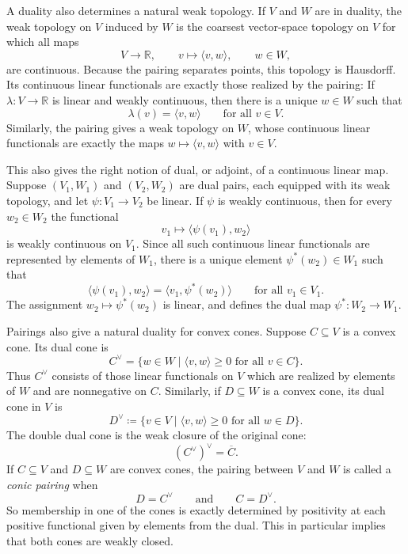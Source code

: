 \documentclass[11pt,onecolumn]{article}
\theoremstyle{plain}
\theoremstyle{definition}
\begin{document}
A duality also determines a natural weak topology.  If $V$ and $W$ are in
duality, the weak topology on $V$ induced by $W$ is
the coarsest vector-space topology on $V$ for which all maps
\[
    V\to\mathbb{R},\qquad v\mapsto \langle v,w\rangle,
    \qquad w\in W,
\]
are continuous. 
Because the pairing separates points, this topology is Hausdorff.  Its
continuous linear functionals are exactly those realized by the pairing: If
$\lambda\colon V\to\mathbb{R}$ is linear and weakly continuous,
then there is a unique $w\in W$ such that
\[
    \lambda(v)=\langle v,w\rangle \qquad\text{for all } v\in V.
\]
Similarly, the pairing gives a weak topology on $W$, whose continuous linear functionals are exactly the
maps $w\mapsto \langle v,w\rangle$ with $v\in V$.

This also gives the right notion of dual, or adjoint, of a continuous linear
map.  Suppose $(V_1,W_1)$ and $(V_2,W_2)$ are dual pairs, each equipped with
its weak topology, and let $\psi\colon V_1\to V_2$ be linear.  If $\psi$ is weakly 
continuous, then for every
$w_2\in W_2$ the functional
\[
    v_1\longmapsto \langle \psi(v_1),w_2\rangle
\]
is weakly continuous on $V_1$.  Since all such continuous
linear functionals are represented by elements of $W_1$, there is a unique
element $\psi^*(w_2)\in W_1$ such that
\[
    \langle \psi(v_1),w_2\rangle=\langle v_1,\psi^*(w_2)\rangle
    \qquad\text{for all }v_1\in V_1.
\]
The assignment $w_2\mapsto \psi^*(w_2)$ is linear, and defines the dual map
\(
    \psi^*\colon W_2\to W_1.
\)

Pairings also give a natural duality for convex cones.  Suppose
$C\subseteq V$ is a convex cone.  Its dual cone is
\[
    C^\vee=\{w\in W\mid \langle v,w\rangle\geqslant 0
    \text{ for all } v\in C\}.
\]
Thus $C^\vee$ consists of those linear functionals on $V$ which are realized
by elements of $W$ and are nonnegative on $C$.  Similarly, if
$D\subseteq W$ is a convex cone, its dual cone in $V$ is
\[
    D^\vee\coloneqq\{v\in V\mid \langle v,w\rangle\geqslant 0
    \text{ for all } w\in D\}.
\]
The double dual cone is the weak closure of the original cone:
\[
    (C^\vee)^\vee=\overline{C}.
\]
If $C\subseteq V$ and $D\subseteq W$ are convex cones, the pairing between $V$ and $W$ is called a \emph{conic pairing} when
\[
    D=C^\vee
    \qquad\text{and}\qquad
    C=D^\vee.
\]
So membership in one of the cones is exactly determined by positivity at each positive functional given by elements from the dual. This in particular implies that both cones are weakly closed.
\end{document}
